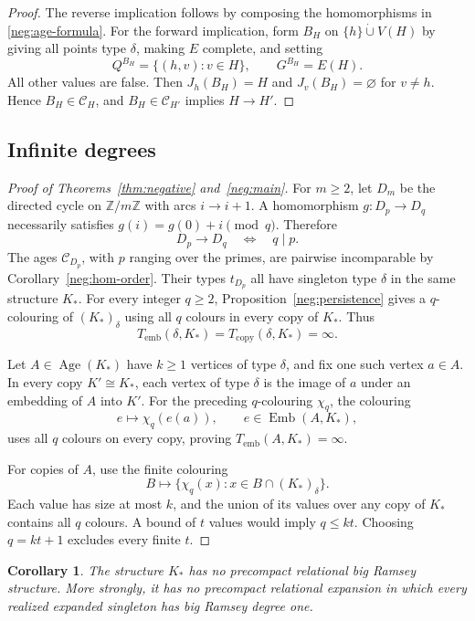 \documentclass{article}
\numberwithin{equation}{section}
\newtheorem{corollary}[theorem]{Corollary}
\theoremstyle{definition}
\DeclareMathOperator{\Emb}{Emb}
\DeclareMathOperator{\Age}{Age}
\newcommand{\brd}{T_{\mathrm{emb}}}
\newcommand{\crd}{T_{\mathrm{copy}}}
\begin{document}
\begin{proof}
The reverse implication follows by composing the homomorphisms in
\eqref{neg:age-formula}. For the forward implication, form $B_H$ on
$\{h\}\dot\cup V(H)$ by giving all points type $\delta$, making $E$
complete, and setting
\[
 Q^{B_H}=\{(h,v):v\in H\},\qquad G^{B_H}=E(H).
\]
All other values are false. Then
$J_h(B_H)=H$ and $J_v(B_H)=\varnothing$ for $v\ne h$. Hence
$B_H\in\mathcal C_H$, and $B_H\in\mathcal C_{H'}$ implies $H\to H'$.
\end{proof}

\subsection{Infinite degrees}
\label{neg:infinite}

\begin{proof}[Proof of Theorems~\ref{thm:negative} and~\ref{neg:main}]
For $m\ge2$, let $D_m$ be the directed cycle on $\mathbb Z/m\mathbb Z$
with arcs $i\to i+1$. A homomorphism $g:D_p\to D_q$ necessarily satisfies
$g(i)=g(0)+i\pmod q$. Therefore
\[
 D_p\to D_q\quad\Longleftrightarrow\quad q\mid p.
\]
The ages $\mathcal C_{D_p}$, with $p$ ranging over the primes, are pairwise
incomparable by Corollary~\ref{neg:hom-order}. Their types $t_{D_p}$ all
have singleton type $\delta$ in the same structure $K_*$. For every
integer $q\geq2$, Proposition~\ref{neg:persistence} gives a $q$-colouring of
$(K_*)_\delta$ using all $q$ colours in every copy of $K_*$. Thus
\[
 \brd(\delta,K_*)=\crd(\delta,K_*)=\infty.
\]

Let $A\in\Age(K_*)$ have $k\ge1$ vertices of type $\delta$, and fix one
such vertex $a\in A$. In every copy $K'\cong K_*$, each vertex of type
$\delta$ is the image of $a$ under an embedding of $A$ into $K'$.
For the preceding $q$-colouring $\chi_q$, the colouring
\[
 e\longmapsto\chi_q(e(a)),\qquad e\in\Emb(A,K_*),
\]
uses all $q$ colours on every copy, proving $\brd(A,K_*)=\infty$.

For copies of $A$, use the finite colouring
\[
 B\longmapsto\{\chi_q(x):x\in B\cap(K_*)_\delta\}.
\]
Each value has size at most $k$, and the union of its values over any
copy of $K_*$ contains all $q$ colours. A bound of $t$ values would imply
$q\le kt$. Choosing $q=kt+1$ excludes every finite $t$.
\end{proof}

\begin{corollary}\label{neg:no-brs}
The structure $K_*$ has no precompact relational big Ramsey structure.
More strongly, it has no precompact relational expansion in which every
realized expanded singleton has big Ramsey degree one.
\end{corollary}
\end{document}
